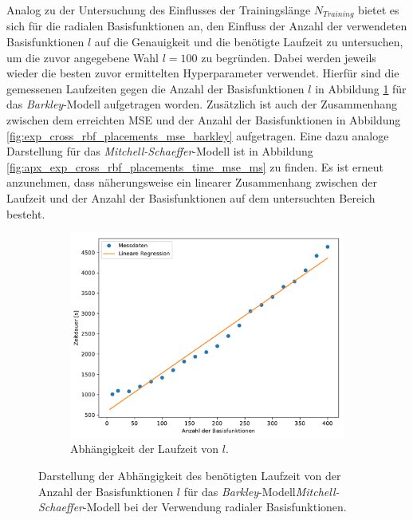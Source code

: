 Analog zu der Untersuchung des Einflusses der Trainingslänge $N_{Training}$ bietet es sich für die radialen Basisfunktionen an, den Einfluss der Anzahl der verwendeten Basisfunktionen $l$ auf die Genauigkeit und die benötigte Laufzeit zu untersuchen, um die zuvor angegebene Wahl $l=100$ zu begründen. Dabei werden jeweils wieder die besten zuvor ermittelten Hyperparameter verwendet. Hierfür sind die gemessenen Laufzeiten gegen die Anzahl der Basisfunktionen $l$ in Abbildung \ref{fig:exp_cross_rbf_placements_time_barkley} für das \textit{Barkley}-Modell aufgetragen worden. Zusätzlich ist auch der Zusammenhang zwischen dem erreichten MSE und der Anzahl der Basisfunktionen in Abbildung \ref{fig:exp_cross_rbf_placements_mse_barkley} aufgetragen. Eine dazu analoge Darstellung für das \textit{Mitchell-Schaeffer}-Modell ist in Abbildung \ref{fig:apx_exp_cross_rbf_placements_time_mse_ms} zu finden. Es ist erneut anzunehmen, dass näherungsweise ein linearer Zusammenhang zwischen der Laufzeit und der Anzahl der Basisfunktionen auf dem untersuchten Bereich besteht.

\begin{figure}[h]
	\centering
	\begin{subfigure}{\textwidth}
		\centering
		\includegraphics[width=4.2in]{figures/results/cross_prediction/rbf_placements_uv_time.pdf}
		\caption{Abhängigkeit der Laufzeit von $l$.}
	\end{subfigure}%
	\caption{Darstellung der Abhängigkeit des benötigten Laufzeit von der Anzahl der Basisfunktionen $l$ für das \textit{Barkley}-Modell\textit{Mitchell-Schaeffer}-Modell bei der Verwendung radialer Basisfunktionen.}
	\label{fig:exp_cross_rbf_placements_time_barkley}
\end{figure}

